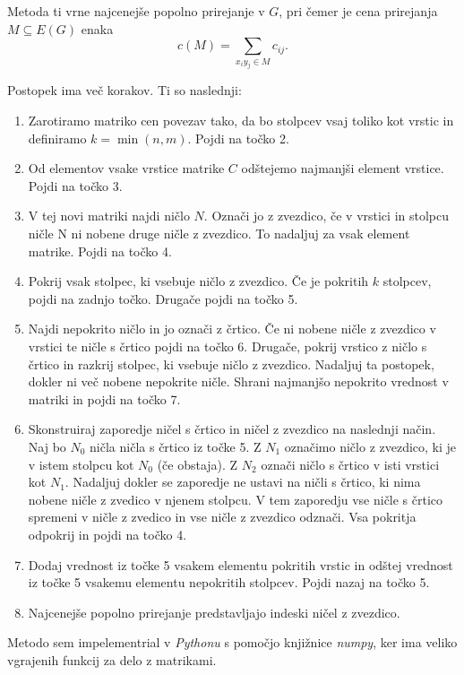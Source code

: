 \documentclass[a4paper, 12pt]{article}
\begin{document}
Metoda ti vrne najcenejše popolno prirejanje v $G$, pri čemer je cena prirejanja $M \subseteq E(G)$ enaka
$$ c(M) = \sum_{x_iy_j \in M}c_{ij}. $$

Postopek ima več korakov. Ti so naslednji:
\begin{enumerate}
    \item Zarotiramo matriko cen povezav tako, da bo stolpcev vsaj toliko kot vrstic in 
            definiramo $k = \min{(n,m)}$. Pojdi na točko 2.
    \item Od elementov vsake vrstice matrike $C$ odštejemo najmanjši element vrstice. Pojdi
            na točko 3.
    \item V tej novi matriki najdi ničlo $N$. Označi jo z zvezdico, če v vrstici in stolpcu ničle
            N ni nobene druge ničle z zvezdico. To nadaljuj za vsak element matrike. Pojdi na točko 4.
    \item Pokrij vsak stolpec, ki vsebuje ničlo z zvezdico. Če je pokritih $k$ stolpcev, pojdi na 
            zadnjo točko. Drugače pojdi na točko 5.
    \item Najdi nepokrito ničlo in jo označi z črtico. Če ni nobene ničle z zvezdico v vrstici te
            ničle s črtico pojdi na točko 6. Drugače, pokrij vrstico z ničlo s črtico in razkrij
            stolpec, ki vsebuje ničlo z zvezdico. Nadaljuj ta postopek, dokler ni več nobene nepokrite
            ničle. Shrani najmanjšo nepokrito vrednost v matriki in pojdi na točko 7.
    \item Skonstruiraj zaporedje ničel s črtico in ničel z zvezdico na naslednji način. Naj bo $N_0$ ničla
            ničla s črtico iz točke 5. Z $N_1$ označimo ničlo z zvezdico, ki je v istem stolpcu kot $N_0$ (če obstaja).
            Z $N_2$ označi ničlo s črtico v isti vrstici kot $N_1$. Nadaljuj dokler se zaporedje ne ustavi
            na ničli s črtico, ki nima nobene ničle z zvedico v njenem stolpcu. V tem zaporedju vse ničle s
            črtico spremeni v ničle z zvedico in vse ničle z zvezdico odznači. Vsa pokritja odpokrij in pojdi
            na točko 4.
    \item Dodaj vrednost iz točke 5 vsakem elementu pokritih vrstic in odštej vrednost iz točke 5 vsakemu
            elementu nepokritih stolpcev. Pojdi nazaj na točko 5.
    \item Najcenejše popolno prirejanje predstavljajo indeski ničel z zvezdico.
\end{enumerate}

Metodo sem impelementrial v \textit{Pythonu} s pomočjo knjižnice \textit{numpy},
ker ima veliko vgrajenih funkcij za delo z matrikami.
\end{document}
